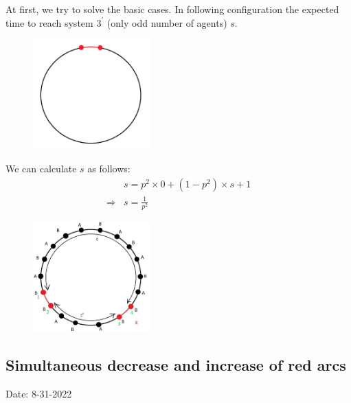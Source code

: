 \documentclass[]{book}
\theoremstyle{definition}
\begin{document}
At first, we try to solve the basic cases. In following configuration the expected time to reach system $3^\prime$ (only odd number of agents) $s$. 
\begin{figure}[H]
    \centering
    \includegraphics[width=0.4\textwidth]{figures/sync_pure_increase_1.jpg}
    \caption{}
\end{figure}
We can calculate $s$ as follows:
\begin{equation}
\begin{split}
    &s = p^2 \times 0 + \left( 1 - p^2 \right)\times s + 1 \\
    \Rightarrow &s = \frac{1}{p^2}
\end{split}
\end{equation}

\begin{figure}[H]
    \centering
    \includegraphics[width=0.4\textwidth]{figures/sync_pure_increase_2.jpg}
    \caption{}
\end{figure}

\subsection{Simultaneous decrease and increase of red arcs}
\newpage
\begin{center}
Date: 8-31-2022
\end{center}
\end{document}
